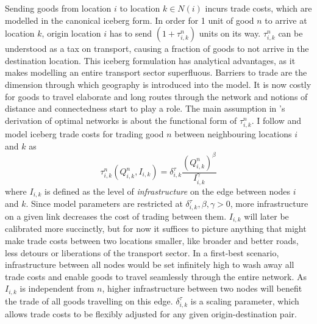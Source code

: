 \documentclass[11pt, oneside]{article}   	%
\begin{document}
Sending goods from location $i$ to location $k \in N(i)$ incurs trade costs, which are modelled in the canonical iceberg form. In order for 1 unit of good $n$ to arrive at location $k$, origin location $i$ has to send $(1+\tau_{i,k}^{n})$ units on its way. $\tau_{i,k}^{n}$ can be understood as a tax on transport, causing a fraction of goods to not arrive in the destination location. This iceberg formulation has analytical advantages, as it makes modelling an entire transport sector superfluous. Barriers to trade are the dimension through which geography is introduced into the model. It is now costly for goods to travel elaborate and long routes through the network and notions of distance and connectedness start to play a role. The main assumption in \cite{fajgelbaum_optimal_2017}'s derivation of optimal networks is about the functional form of $\tau_{i,k}^{n}$. I follow \citeauthor{fajgelbaum_optimal_2017} and model iceberg trade costs for trading good $n$ between neighbouring locations $i$ and $k$ as
\begin{equation}
  \tau_{i,k}^{n}(Q_{i,k}^{n}, I_{i,k}) = \delta^{\tau}_{i,k} \frac{(Q_{i,k}^{n})^{\beta}}{I_{i,k}^{\gamma}}
  \label{eq:tau}
\end{equation}
where $I_{i,k}$ is defined as the level of \emph{infrastructure} on the edge between nodes $i$ and $k$. Since model parameters are restricted at $\delta^{\tau}_{i,k}, \beta, \gamma >0$, more infrastructure on a given link decreases the cost of trading between them. $I_{i,k}$ will later be calibrated more succinctly, but for now it suffices to picture anything that might make trade costs between two locations smaller, like broader and better roads, less detours or liberations of the transport sector. In a first-best scenario, infrastructure between all nodes would be set infinitely high to wash away all trade costs and enable goods to travel seamlessly through the entire network. As $I_{i,k}$ is independent from $n$, higher infrastructure between two nodes will benefit the trade of all goods travelling on this edge. $\delta^{\tau}_{i,k}$ is a scaling parameter, which allows trade costs to be flexibly adjusted for any given origin-destination pair.
\end{document}
